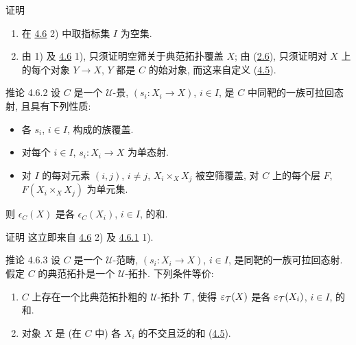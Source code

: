 \begin{enonce*}[remark]{证明}
\begin{enumerate}
\renewcommand{\labelenumi}{\theenumi)}
\item 在 \hyperref[II.prop4.6]{4.6} 2) 中取指标集 $I$ 为空集.

\item 由 1) 及 \hyperref[II.prop4.6]{4.6} 1),
只须证明空筛关于典范拓扑覆盖 $X$;
\ie 由 (\hyperref[II.prop2.6]{2.6}),
只须证明对 $X$ 上的每个对象 $Y\rightarrow X$,
$Y$ 都是 $C$ 的始对象, 而这来自定义 (\hyperref[II.def4.5]{4.5}).
\end{enumerate}
\end{enonce*}

\begin{enonce*}{推论 4.6.2}
设 $C$ 是一个 $𝒰$-景,
$(s_i:X_i\rightarrow X)$, $i\in I$,
是 $C$ 中同靶的一族可拉回态射, 且具有下列性质:
\begin{itemize}
\item[$\alpha)$] 各 $s_i$, $i\in I$, 构成的族覆盖.

\item[$\beta)$] 对每个 $i\in I$, $s_i:X_i\rightarrow X$ 为单态射.

\item[$\gamma)$] 对 $I$ 的每对元素 $(i,j)$, $i\neq j$,
$X_i\times_X X_j$ 被空筛覆盖,
\ie 对 $C$ 上的每个层 $F$, $F(X_i\times_X X_j)$ 为单元集.
\end{itemize}
则 $\epsilon_C(X)$ 是各 $\epsilon_C(X_i)$, $i\in I$, 的和.
\end{enonce*}

\begin{enonce*}[remark]{证明}
这立即\pageoriginale{}来自 \hyperref[II.prop4.6]{4.6} 2)
及 \hyperref[II.cor4.6.1]{4.6.1} 1).
\end{enonce*}



\begin{enonce*}{推论 4.6.3}
设 $C$ 是一个 $𝒰$-范畴,
$(s_i:X_i\rightarrow X)$, $i\in I$, 是同靶的一族可拉回态射.
假定 $C$ 的典范拓扑是一个 $𝒰$-拓扑.
下列条件等价:
\begin{enumerate}
\renewcommand{\theenumi}{\roman{enumi}}
\renewcommand{\labelenumi}{\theenumi)}
\item $C$ 上存在一个比典范拓扑粗的 $𝒰$-拓扑 ${\mathcal T}$,
使得 $\varepsilon_{\mathcal T}(X)$ 是各 $\varepsilon_{\mathcal T}(X_i)$, $i\in I$, 的和.

\item 对象 $X$ 是 (在 $C$ 中) 各 $X_i$ 的不交且泛的和
(\hyperref[II.def4.5]{4.5}).
\end{enumerate}
\end{enonce*}

